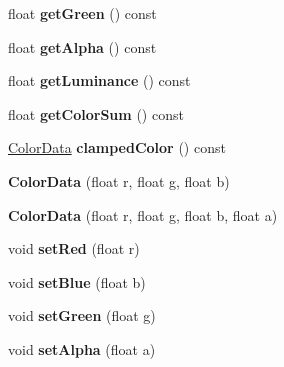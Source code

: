 \begin{DoxyCompactItemize}
\item 
\hypertarget{classColorData_a7e2e03b8e1e3270f33c4e4a69c00dbd6}{float {\bfseries get\-Green} () const }\label{classColorData_a7e2e03b8e1e3270f33c4e4a69c00dbd6}

\item 
\hypertarget{classColorData_a198c4490b4f1c512d2bc174418dc892a}{float {\bfseries get\-Alpha} () const }\label{classColorData_a198c4490b4f1c512d2bc174418dc892a}

\item 
\hypertarget{classColorData_ae6a0100e4e5fe7bbd00fb4defd6e4a43}{float {\bfseries get\-Luminance} () const }\label{classColorData_ae6a0100e4e5fe7bbd00fb4defd6e4a43}

\item 
\hypertarget{classColorData_a3f0f9e50c730eb653efd800070cf448c}{float {\bfseries get\-Color\-Sum} () const }\label{classColorData_a3f0f9e50c730eb653efd800070cf448c}

\item 
\hypertarget{classColorData_a5479f50514f714dc9c738a50b7b86365}{\hyperlink{classColorData}{Color\-Data} {\bfseries clamped\-Color} () const }\label{classColorData_a5479f50514f714dc9c738a50b7b86365}

\item 
\hypertarget{classColorData_a920b0332685ef72147fe19020fdac5d6}{{\bfseries Color\-Data} (float r, float g, float b)}\label{classColorData_a920b0332685ef72147fe19020fdac5d6}

\item 
\hypertarget{classColorData_a0ecce2c6c597d9379ebb329883298dfd}{{\bfseries Color\-Data} (float r, float g, float b, float a)}\label{classColorData_a0ecce2c6c597d9379ebb329883298dfd}

\item 
\hypertarget{classColorData_aa2e401956936f87a560b8f579514bf69}{void {\bfseries set\-Red} (float r)}\label{classColorData_aa2e401956936f87a560b8f579514bf69}

\item 
\hypertarget{classColorData_a01bbba90cac0bc1b3bd01d4aecc16477}{void {\bfseries set\-Blue} (float b)}\label{classColorData_a01bbba90cac0bc1b3bd01d4aecc16477}

\item 
\hypertarget{classColorData_a4a7833dfef4a33eee3857de09a72aee1}{void {\bfseries set\-Green} (float g)}\label{classColorData_a4a7833dfef4a33eee3857de09a72aee1}

\item 
\hypertarget{classColorData_a547fb7bd1616e8657a825cb9a34c43c1}{void {\bfseries set\-Alpha} (float a)}\label{classColorData_a547fb7bd1616e8657a825cb9a34c43c1}


\end{DoxyCompactItemize}
